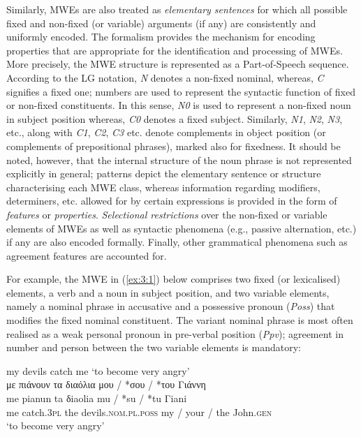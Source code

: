 \documentclass[output=paper]{langsci/langscibook}
\begin{document}
Similarly, MWEs are also treated as \textit{elementary
sentences} for which all possible fixed and non-fixed (or variable)
arguments (if any) are consistently and uniformly encoded. The
formalism provides the mechanism for encoding properties that are
appropriate for the identification and processing of MWEs. More
precisely, the MWE structure is represented as a Part-of-Speech sequence.
According to the LG notation, \textit{Ν }denotes a non-fixed nominal,
whereas, \textit{C} signifies a fixed one; numbers are used to
represent the syntactic function of fixed or non-fixed constituents. In
this sense, \textit{N0} is used to represent a non-fixed noun in
subject position whereas, \textit{C0} denotes a fixed subject.
Similarly, \textit{N1}, \textit{N2}, \textit{N3}, etc., along with
\textit{C1}, \textit{C2}, \textit{C3} etc. denote complements in object
position (or complements of prepositional phrases), marked also for
fixedness. It should be noted, however, that the internal structure of
the noun phrase is not represented explicitly in general; patterns
depict the elementary sentence or structure characterising each MWE class,
whereas information regarding modifiers, determiners, etc. allowed for
by certain expressions is provided in the form of
\textit{features} or \textit{properties}.
\textit{Selectional restrictions} over the non-fixed or
variable elements of MWEs as well as syntactic phenomena (e.g.,  passive
alternation, etc.) \textendash{} if any \textendash{} are also encoded formally. Finally, other
grammatical phenomena such as agreement features are accounted for. 



For example, the MWE in (\ref{ex:3:1}) below comprises two fixed (or lexicalised)
elements, a verb and a noun in subject position, and two variable
elements, namely a nominal phrase in accusative and a possessive
pronoun (\textit{Poss}) that modifies the fixed nominal constituent. The variant
nominal phrase is most often realised as a weak personal pronoun in
pre-verbal position (\textit{Ppv}); agreement in number and person between the two variable
elements is mandatory:

\begin{exe}
\ex \label{ex:3:1}
my devils catch me `to become very angry'\\
\glll με πιάνουν τα διαόλια μου / *σου / *του Γιάννη \\
me pianun ta δiaolia mu / *su /  *tu Γiani\\
me catch.\textsc{3pl} the devils.\textsc{nom.pl.poss} my / your / the John.\textsc{gen}\\
\glt %
`to become very angry'
\end{exe}
\end{document}
